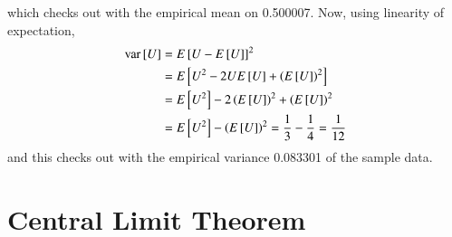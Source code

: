 \documentclass[journal,12pt,twocolumn]{IEEEtran}
\begin{document}
which checks out with the empirical mean on 0.500007. Now, using linearity of expectation,
\begin{align}
	\text{var}{}\left[U\right] &= E{}\left[U - E{}\left[U\right]\right]^2 \\
	&= E{}\left[U^2 - 2UE{}\left[U\right] + \left(E{}\left[U\right]\right)^2\right] \\
	&= E{}\left[U^2\right] - 2\left(E{}\left[U\right]\right)^2 + \left(E{}\left[U\right]\right)^2 \\
	&= E{}\left[U^2\right] - \left(E{}\left[U\right]\right)^2 = \frac{1}{3} - \frac{1}{4} = \frac{1}{12} \\
\end{align}
and this checks out with the empirical variance 0.083301 of the sample data.
\section{Central Limit Theorem}
%
\end{document}
